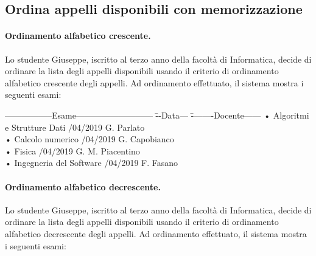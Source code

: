  
\subsection{Ordina appelli disponibili con memorizzazione}
\paragraph{Ordinamento alfabetico crescente.}
Lo studente Giuseppe, iscritto al terzo anno della facoltà di Informatica, decide di ordinare la lista degli appelli disponibili usando il criterio di ordinamento alfabetico crescente degli appelli. Ad ordinamento effettuato, il sistema mostra i seguenti esami:

\begin{tabbing}
	\hspace{1cm}-----------------Esame--------------------------- \= --Data--- \= --------Docente------ \kill
	\hspace{1cm} • Algoritmi e Strutture Dati /04/2019 \> \hspace{1cm} G. Parlato \\
	\hspace{1cm} • Calcolo numerico /04/2019  \> \hspace{1cm} G. Capobianco \\
	\hspace{1cm} • Fisica /04/2019 \> \hspace{1cm} G. M. Piacentino  \\
	\hspace{1cm} • Ingegneria del Software /04/2019   \> \hspace{1cm} F. Fasano \\
\end{tabbing}

\paragraph{Ordinamento alfabetico decrescente.}
Lo studente Giuseppe, iscritto al terzo anno della facoltà di Informatica, decide di ordinare la lista degli appelli disponibili usando il criterio di ordinamento alfabetico decrescente degli appelli. Ad ordinamento effettuato, il sistema mostra i seguenti esami:

